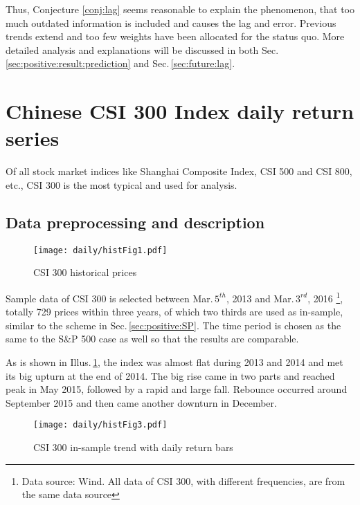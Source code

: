 Thus, Conjecture \ref{conj:lag} seems reasonable to explain the phenomenon,
that too much outdated information is included and causes the lag and error.
Previous trends extend and too few weights have been allocated for the status quo.
More detailed analysis and explanations will be discussed in 
both Sec.\,\ref{sec:positive:result:prediction} and Sec.\,\ref{sec:future:lag}.


\section{Chinese CSI 300 Index daily return series}
\label{sec:positive:CSI}
Of all stock market indices like Shanghai Composite Index, CSI 500 and CSI 800, etc.,
CSI 300 is the most typical and used for analysis.

\subsection{Data preprocessing and description}
\label{sec:positive:CSI:data}

        \begin{figure}[!hbt]
        \center
        \texttt{[image: daily/histFig1.pdf]}
        \caption{CSI 300 historical prices}
        \label{fig:CSI:hist}
        \end{figure}
Sample data of CSI 300 is selected between Mar.\,$5^{th}$, 2013 and Mar.\,$3^{rd}$, 2016
\footnote{Data source: Wind. All data of CSI 300, 
with different frequencies, are from the same data source},
totally 729 prices within three years, 
of which two thirds are used as in-sample, similar to the scheme in Sec.\,\ref{sec:positive:SP}. 
The time period is chosen as the same to the S\&P 500 case as well
so that the results are comparable.

As is shown in Illus.\,\ref{fig:CSI:hist},
the index was almost flat during 2013 and 2014 and met its big upturn at the end of 2014.
The big rise came in two parts and reached peak in May 2015,
followed by a rapid and large fall.
Rebounce occurred around September 2015 and then came another downturn in December.

        \begin{figure}[!hbt]
        \center
        \texttt{[image: daily/histFig3.pdf]}
        \caption{CSI 300 in-sample trend with daily return bars}
        \label{fig:CSI:histin}
        \end{figure}

